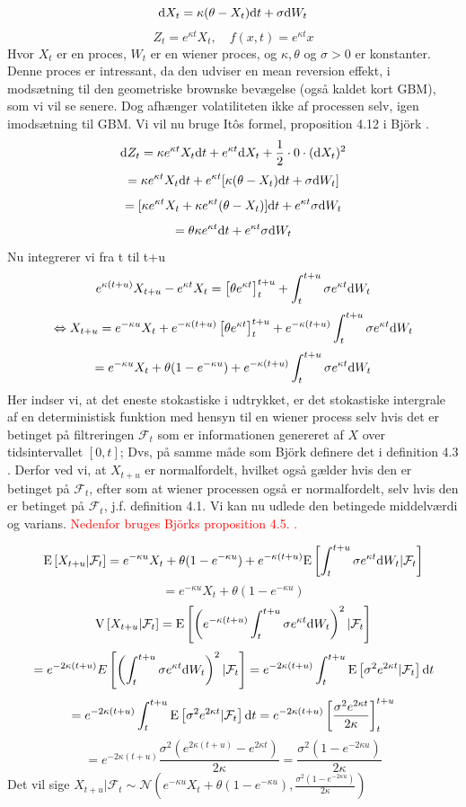 \documentclass{article}
\theoremstyle{definition}
\theoremstyle{remark}
\newcommand\ens{\Leftrightarrow}
\begin{document}
$$\text d X_t = \kappa(\theta - X_t)\text dt+\sigma \text dW_t$$
$$Z_t=e^{\kappa t}X_t,\quad f(x,t)= e^{\kappa t}x$$
Hvor $X_t$ er en proces, $W_t$ er en wiener proces, og $\kappa,\theta$ og $\sigma>0$ er konstanter. Denne proces er intressant, da den udviser en mean reversion effekt, i modsætning til den geometriske brownske bevægelse (også kaldet kort GBM), som vi vil se senere. Dog afhænger volatiliteten ikke af processen selv, igen imodsætning til GBM. Vi vil nu bruge Itôs formel, proposition 4.12 i Björk  \cite{Bjork2020}.
$$\text dZ_t = \kappa e^{\kappa t}X_t\text dt + e^{\kappa t}\text dX_t +\frac12\cdot0\cdot(\text dX_t)^2$$
$$=\kappa e^{\kappa t}X_t\text dt + e^{\kappa t}[\kappa(\theta - X_t)\text dt +\sigma \text dW_t]$$
$$=[\kappa e^{\kappa t}X_t+\kappa e^{\kappa t}(\theta - X_t)]\text dt + e^{\kappa t}\sigma \text dW_t$$
$$=\theta\kappa e^{\kappa t}\text dt + e^{\kappa t}\sigma \text dW_t$$
Nu integrerer vi fra t til t+u
$$e^{\kappa(t+u)}X_{t+u}-e^{\kappa t}X_t=\left[\theta e^{\kappa t}\right]_{t}^{t+u}+\int_{t}^{t+u}\sigma e^{\kappa t}\text d W_t$$
$$\ens X_{t+u}=e^{-\kappa u}X_t + e^{-\kappa(t+u)}\left[\theta e^{\kappa t}\right]_{t}^{t+u}+e^{-\kappa(t+u)}\int_{t}^{t+u}\sigma e^{\kappa t}\text d W_t$$
$$=e^{-\kappa u}X_t + \theta(1-e^{-\kappa u})+e^{-\kappa(t+u)}\int_{t}^{t+u}\sigma e^{\kappa t}\text d W_t$$
Her indser vi, at det eneste stokastiske i udtrykket, er det stokastiske intergrale af en deterministisk funktion med hensyn til en wiener process selv hvis det er betinget på filtreringen $\mathcal F_t$ som er informationen genereret af $X$ over tidsintervallet $[0,t]$; Dvs, på samme måde som Björk definere det i definition 4.3 \cite{Bjork2020}. Derfor ved vi, at $X_{t+u}$ er normalfordelt, hvilket også gælder hvis den er betinget på $\mathcal F_t$, efter som at wiener processen også er normalfordelt, selv hvis den er betinget på $\mathcal F_t$, j.f. \cite{Bjork2020} definition 4.1. Vi kan nu udlede den betingede middelværdi og varians. \textcolor{red}{Nedenfor bruges Björks proposition 4.5. \cite{Bjork2020}.}

$$\text E\left[X_{t+u}|\mathcal F_t\right] = e^{-\kappa u}X_t + \theta(1-e^{-\kappa u}) + e^{-\kappa(t+u)}\text E\left[\int_{t}^{t+u}\sigma e^{\kappa t}\text d W_t|\mathcal F_t\right]$$
$$=e^{-\kappa u}X_t + \theta(1-e^{-\kappa u})$$
$$\text V\left[X_{t+u}|\mathcal F_t\right]= \text E\left[\left(e^{-\kappa(t+u)}\int_{t}^{t+u}\sigma e^{\kappa t}\text d W_t\right)^2|\mathcal F_t\right]$$
\textcolor{red}{$$= e^{-2\kappa(t+u)}E\left[\left(\int_{t}^{t+u}\sigma e^{\kappa t}\text d W_t\right)^2|\mathcal F_t\right]= e^{-2\kappa(t+u)}\int_{t}^{t+u}\text E \left[\sigma^2 e^{2\kappa t}|\mathcal F_t\right]\text dt$$\newpage
$$=e^{-2\kappa(t+u)}\int_{t}^{t+u}\text E \left[\sigma^2 e^{2\kappa t}|\mathcal F_t\right]\text dt=e^{-2\kappa(t+u)}\left[\frac{\sigma^2 e^{2\kappa t}}{2\kappa}\right]_{t}^{t+u}$$}
$$=e^{-2\kappa(t+u)}\frac{\sigma^2 (e^{2\kappa (t+u)}-e^{2\kappa t})}{2\kappa}=\frac{\sigma^2 (1-e^{-2\kappa u})}{2\kappa}$$
Det vil sige $X_{t+u}|\mathcal F_t\sim\mathcal N\left(e^{-\kappa u}X_t + \theta(1-e^{-\kappa u}),\frac{\sigma^2 (1-e^{-2\kappa u})}{2\kappa}\right)$
\end{document}
